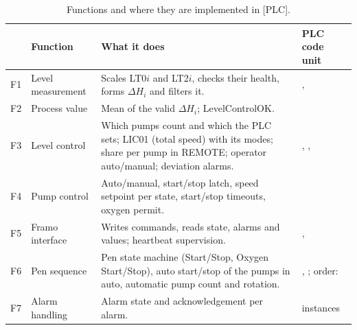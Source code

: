 \documentclass[11pt,a4paper]{article}
\begin{document}
\begin{table}[htbp]
\centering\small
\caption{Functions and where they are implemented in [PLC].}
\label{tab:funcs}
\begin{tabularx}{\textwidth}{@{}P{9mm}P{30mm}LP{36mm}@{}}
\toprule
& Function & What it does & PLC code unit \\
\midrule
F1 & Level measurement & Scales LT0$i$ and LT2$i$, checks their health, forms $\Delta H_i$ and filters it. & ,  \\
F2 & Process value & Mean of the valid $\Delta H_i$; LevelControlOK. &  \\
F3 & Level control & Which pumps count and which the PLC sets; LIC01 (total speed) with its modes; share per pump in REMOTE; operator auto/manual; deviation alarms. & , ,  \\
F4 & Pump control & Auto/manual, start/stop latch, speed setpoint per state, start/stop timeouts, oxygen permit. &  \\
F5 & Framo interface & Writes commands, reads state, alarms and values; heartbeat supervision. & ,  \\
F6 & Pen sequence & Pen state machine (Start/Stop, Oxygen Start/Stop), auto start/stop of the pumps in auto, automatic pump count and rotation. & , ; order:  \\
F7 & Alarm handling & Alarm state and acknowledgement per alarm. &  instances \\
\bottomrule
\end{tabularx}
\end{table}
\end{document}
